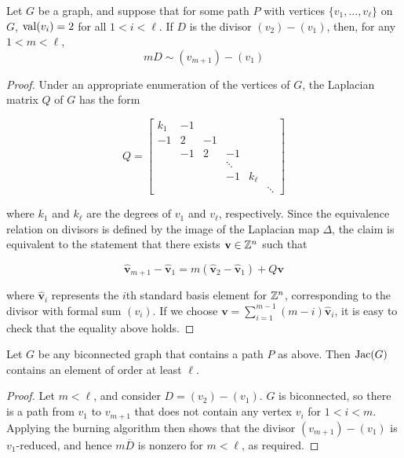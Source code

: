 \documentclass{amsart}
\newcommand{\bv}[1]{\widehat{\mathbf{#1}}}
\begin{document}
\begin{lem}
  \label{lem:2valent_path}
  Let $G$ be a graph, and suppose that for some path $P$ with vertices
  $\{v_1, \ldots, v_\ell\}$ on $G$, $\operatorname{val}(v_i) = 2$ for all $1 < i <
  \ell$. If $D$ is the divisor $(v_2) - (v_1)$, then, for any $1 < m <
  \ell$,
  \begin{equation*}
    mD \sim (v_{m+1}) - (v_1)
  \end{equation*}
\end{lem}
\begin{proof}
  Under an appropriate enumeration of the vertices of $G$, the
  Laplacian matrix $Q$ of $G$ has the form

  $$Q = \begin{bmatrix}
    k_1 & -1 \\
    -1 &  2 & -1 \\
    & -1 &  2 & -1 \\
    &    &    &  \ddots  \\
    &    &    &  -1 & k_\ell \\ 
    &    &    &     &    & \ddots
  \end{bmatrix}$$

  where $k_1$ and $k_\ell$ are the degrees of $v_1$ and $v_\ell$,
  respectively. Since the equivalence relation on divisors is defined
  by the image of the Laplacian map $\Delta$, the claim is equivalent
  to the statement that there exists $\mathbf{v} \in \mathbb{Z}^n$ such that

  \begin{equation*}
    \bv{v}_{m+1} - \bv{v}_1  = m(\bv{v}_2 - \bv{v}_1) + Q\mathbf{v}
  \end{equation*}

  where $\bv{v}_i$ represents the $i$th standard basis element for
  $\mathbb{Z}^n$, corresponding to the divisor with formal sum $(v_i)$. If we
  choose $\mathbf{v} = \sum_{i=1}^{m - 1}(m - i)\bv{v}_i$, it is
  easy to check that the equality above holds.
\end{proof}

\begin{cor}
  \label{cor:2valent_path}
  Let $G$ be any biconnected graph that contains a path $P$ as
  above. Then $\operatorname{Jac}(G)$ contains an element of order at least $\ell$.
\end{cor}
\begin{proof}
  Let $m < \ell$, and consider $D = (v_2) - (v_1)$. $G$ is
  biconnected, so there is a path from $v_1$ to $v_{m+1}$ that does
  not contain any vertex $v_i$ for $1 < i < m$. Applying the burning
  algorithm then shows that the divisor $(v_{m+1}) - (v_1)$ is
  $v_1$-reduced, and hence $m\overline{D}$ is nonzero for $m < \ell$,
  as required.
\end{proof}
\end{document}
